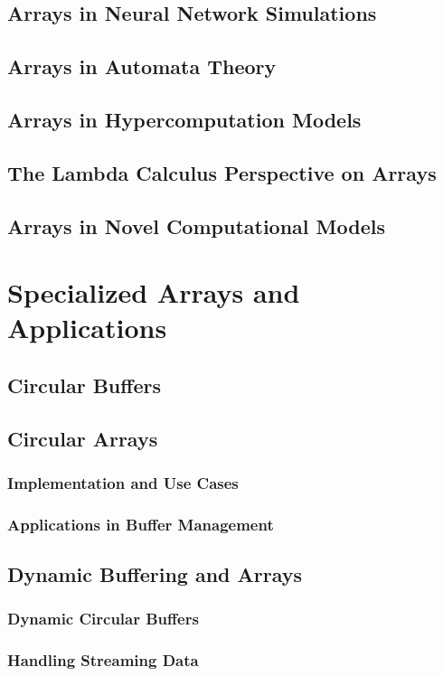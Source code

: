 \documentclass[12pt, oneside]{book}
\begin{document}
\section{Arrays in Neural Network Simulations}
\section{Arrays in Automata Theory}
\section{Arrays in Hypercomputation Models}
\section{The Lambda Calculus Perspective on Arrays}
\section{Arrays in Novel Computational Models}

\chapter{Specialized Arrays and Applications}
	\section{Circular Buffers}
	\section{Circular Arrays}
	\subsection{Implementation and Use Cases}
	\subsection{Applications in Buffer Management}
	
	\section{Dynamic Buffering and Arrays}
	\subsection{Dynamic Circular Buffers}
	\subsection{Handling Streaming Data}
	
\end{document}
